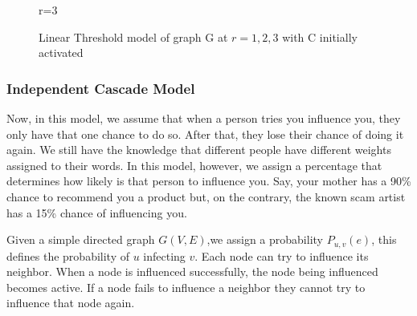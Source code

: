 \begin{figure}[h!]
\begin{minipage}{0.45\textwidth}
	\caption{r=3}
	\end{minipage}
	\caption{Linear Threshold model of graph G at $r=1,2,3$ with C initially activated}
\label{linearfig}
\end{figure}

\subsubsection{Independent Cascade Model}
Now, in this model, we assume that when a person tries you influence you, they only have that one chance to do so. After that, they lose their chance of doing it again. We still have the knowledge that different people have different weights assigned to their words. In this model, however, we assign a percentage that determines how likely is that person to influence you. Say, your mother has a 90\% chance to recommend you a product but, on the contrary, the known scam artist has a 15\% chance of influencing you.

Given a simple directed graph $G(V,E)$,we assign a probability $P_{u,v}(e)$, this defines the probability of $u$ infecting $v$. Each node can try to influence its neighbor. When a node is influenced successfully, the node being influenced becomes active. If a node fails to influence a neighbor they cannot try to influence that node again.\cite{Kempe}\cite{Shakarian:2012:LSN:2456719.2457081}


